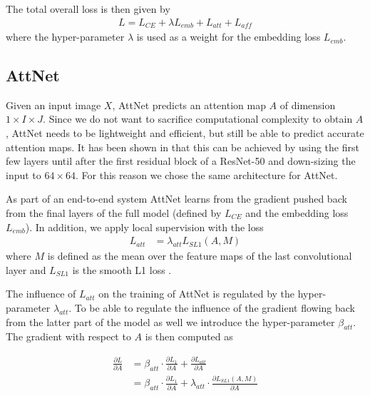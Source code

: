 \documentclass{bmvc2k}
\begin{document}
The total overall loss is then given by
\begin{align}
  \label{formula:E2E_overall_loss}
  L = L_{CE} + \lambda L_{emb} + L_{att} + L_{aff}
\end{align}
where the hyper-parameter $\lambda$ is used as a weight for the embedding loss $L_{emb}$.

\subsection{AttNet}
\label{section:AttNet}
Given an input image $X$, AttNet predicts an attention map $A$ of dimension $1 \times I \times J$. Since we do not want to sacrifice computational complexity to obtain $A$, AttNet needs to be lightweight and efficient, but still be able to predict accurate attention maps. It has been shown in \cite{Hanselmann_2020_WACV} that this can be achieved by using the first few layers until after the first residual block of a ResNet-50 \cite{he2016deep} and down-sizing the input to $64 \times 64$. For this reason we chose the same architecture for AttNet.

As part of an end-to-end system AttNet learns from the gradient pushed back from the final layers of the full model (defined by $L_{CE}$ and the embedding loss $L_{emb}$). In addition, we apply local supervision with the loss
\begin{align}
  \label{formula:E2E_LAtt}
  L_{att} &=  \lambda_{att} L_{SL1}(A,M)
\end{align}
where $M$ is defined as the mean over the feature maps of the last convolutional layer and $L_{SL1}$ is the smooth L1 loss \cite{girshick2015fast}.

The influence of $L_{att}$ on the training of AttNet is regulated by the hyper-parameter $\lambda_{att}$. To be able to regulate the influence of the gradient flowing back from the latter part of the model as well we introduce the hyper-parameter $\beta_{att}$. The gradient with respect to $A$ is then computed as

\begin{align}
  \label{formula:E2E_gradient_att}
  \frac{\partial L}{\partial A} &= \beta_{att} \cdot \frac{\partial L_{1}}{\partial A} + \frac{\partial L_{att}}{\partial A} \\
                                &= \beta_{att} \cdot \frac{\partial L_{1}}{\partial A} + \lambda_{att} \cdot \frac{\partial L_{SL1}(A,M)}{\partial A}
\end{align}
\end{document}
